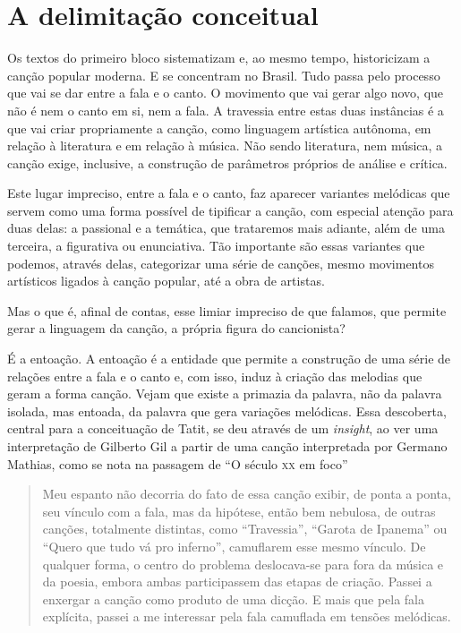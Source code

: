 \section{A delimitação conceitual}

Os textos do primeiro bloco sistematizam e, ao mesmo tempo, historicizam a
canção popular moderna. E se concentram no Brasil. Tudo passa pelo processo 
que vai se dar entre a fala e o canto. O
movimento que vai gerar algo novo, que não é nem o canto em si, nem a
fala. A travessia entre estas duas instâncias é a que vai criar
propriamente a canção, como linguagem artística autônoma, em relação à
literatura e em relação à música. Não sendo literatura, nem música, a
canção exige, inclusive, a construção de parâmetros próprios de análise
e crítica.

Este lugar impreciso, entre a fala e o canto, faz aparecer variantes
melódicas que servem como uma forma possível de tipificar a canção, com
especial atenção para duas delas: a passional e a temática, que
trataremos mais adiante, além de uma terceira, a figurativa ou
enunciativa. Tão importante são essas variantes que podemos, através
delas, categorizar uma série de canções, mesmo movimentos artísticos
ligados à canção popular, até a obra de artistas.

Mas o que é, afinal de contas, esse limiar impreciso de que falamos, que
permite gerar a linguagem da canção, a própria figura do cancionista?

É a entoação. A entoação é a entidade que permite a construção de uma
série de relações entre a fala e o canto e, com isso, induz à criação
das melodias que geram a forma canção. Vejam que existe a primazia da
palavra, não da palavra isolada, mas entoada, da palavra que gera
variações melódicas. Essa descoberta, central para a conceituação de
Tatit, se deu através de um \textit{insight}, ao ver uma interpretação de
Gilberto Gil a partir de uma canção interpretada por Germano Mathias,
como se nota na passagem de ``O século \textsc{xx} em foco''

\begin{quote}
Meu espanto não decorria do fato de essa canção exibir, de ponta a
ponta, seu vínculo com a fala, mas da hipótese, então bem nebulosa, de
outras canções, totalmente distintas, como ``Travessia'', ``Garota de Ipanema''
ou ``Quero que tudo vá pro inferno'', camuflarem esse mesmo vínculo. De
qualquer forma, o centro do problema deslocava-se para fora da música e
da poesia, embora ambas participassem das etapas de criação. Passei a
enxergar a canção como produto de uma dicção. E mais que pela fala
explícita, passei a me interessar pela fala camuflada em tensões
melódicas.
\end{quote}


